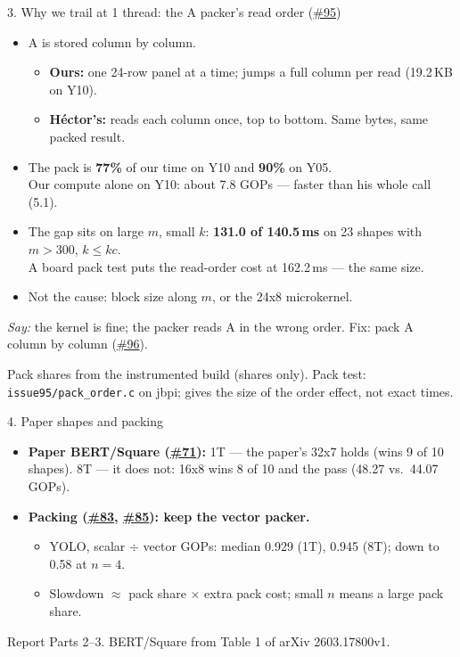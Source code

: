 \documentclass[aspectratio=169,11pt]{beamer}
\newcommand{\iss}[1]{\href{https://github.com/JieGH/RVV_code_gen_via_MLIR_xDSL/issues/#1}{\##1}}
\newcommand{\src}[1]{\par\vfill{\tiny\color{muted}#1\par}}
\newcommand{\say}[1]{{\small\color{muted}\emph{Say:} #1}}
\begin{document}
\begin{frame}{3. Why we trail at 1 thread: the A packer's read order (\iss{95})}
\begin{itemize}
\item A is stored column by column.
  \begin{itemize}
  \item \textbf{Ours:} one 24-row panel at a time; jumps a full column per read (19.2\,KB on Y10).
  \item \textbf{H\'ector's:} reads each column once, top to bottom. Same bytes, same packed result.
  \end{itemize}
\item The pack is \textbf{77\%} of our time on Y10 and \textbf{90\%} on Y05.\\
  Our compute alone on Y10: about 7.8 GOPs --- faster than his whole call (5.1).
\item The gap sits on large $m$, small $k$: \textbf{131.0 of 140.5\,ms} on 23 shapes with $m>300$, $k \le kc$.\\
  A board pack test puts the read-order cost at 162.2\,ms --- the same size.
\item Not the cause: block size along $m$, or the 24x8 microkernel.
\end{itemize}
\say{the kernel is fine; the packer reads A in the wrong order. Fix: pack A column by column (\iss{96}).}
\src{Pack shares from the instrumented build (shares only). Pack test: \texttt{issue95/pack\_order.c} on jbpi; gives the size of the order effect, not exact times.}
\end{frame}

\begin{frame}{4. Paper shapes and packing}
\begin{itemize}
\item \textbf{Paper BERT/Square (\iss{71}):}
  1T --- the paper's 32x7 holds (wins 9 of 10 shapes).
  8T --- it does not: 16x8 wins 8 of 10 and the pass (48.27 vs.\ 44.07 GOPs).
\item \textbf{Packing (\iss{83}, \iss{85}): keep the vector packer.}
  \begin{itemize}
  \item YOLO, scalar $\div$ vector GOPs: median 0.929 (1T), 0.945 (8T); down to 0.58 at $n=4$.
  \item Slowdown $\approx$ pack share $\times$ extra pack cost; small $n$ means a large pack share.
  \end{itemize}
\end{itemize}
\src{Report Parts 2--3. BERT/Square from Table 1 of arXiv 2603.17800v1.}
\end{frame}
\end{document}
